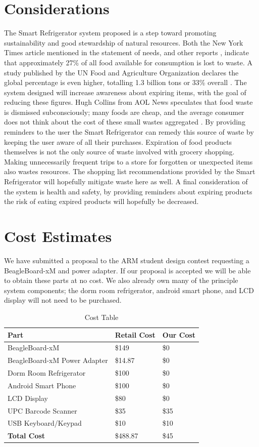 \documentclass[11pt]{article} %
\begin{document}
\section{Considerations}
The Smart Refrigerator system proposed is a step toward promoting sustainability and good stewardship of natural resources. Both the New York Times article mentioned in the statement of needs, and other reports \cite{times, aol}, indicate that approximately 27\% of all food available for consumption is lost to waste. A study published by the UN Food and Agriculture Organization declares the global percentage is even higher, totalling 1.3 billion tons or 33\% overall \cite{dutch}. The system designed will increase awareness about expiring items, with the goal of reducing these figures. Hugh Collins from AOL News speculates that food waste is dismissed subconsciously; many foods are cheap, and the average consumer does not think about the cost of these small wastes aggregated \cite{aol}. By providing reminders to the user the Smart Refrigerator can remedy this source of waste by keeping the user aware of all their purchases. Expiration of food products themselves is not the only source of waste involved with grocery shopping. Making unnecessarily frequent trips to a store for forgotten or unexpected items also wastes resources. The shopping list recommendations provided by the Smart Refrigerator will hopefully mitigate waste here as well. A final consideration of the system is health and safety, by providing reminders about expiring products the risk of eating expired products will hopefully be decreased. 

\section{Cost Estimates}
We have submitted a proposal to the ARM student design contest requesting a BeagleBoard-xM and power adapter. If our proposal is accepted we will be able to obtain these parts at no cost. We also already own many of the principle system components; the dorm room refrigerator, android smart phone, and LCD display will not need to be purchased.
\begin{table}[h!]
\begin{center}
\caption{Cost Table}
\label{tab:cost}
\begin{tabular}{| p{2.5in} | p{1.75in} |p{1.75in} |}
\hline
Part & Retail Cost & Our Cost \\
\hline
BeagleBoard-xM & \$149 & \$0 \\
\hline
BeagleBoard-xM Power Adapter & \$14.87 & \$0 \\
\hline
Dorm Room Refrigerator & \$100 & \$0 \\
\hline
Android Smart Phone & \$100 & \$0  \\
\hline
LCD Display & \$80  & \$0 \\
\hline
UPC Barcode Scanner & \$35 & \$35 \\
\hline
USB Keyboard/Keypad & \$10 & \$10 \\
\hline
\hline
\textbf{Total Cost} & \$488.87 & \$45 \\
\hline
\end{tabular}
\end{center}
\end{table}
\end{document}

